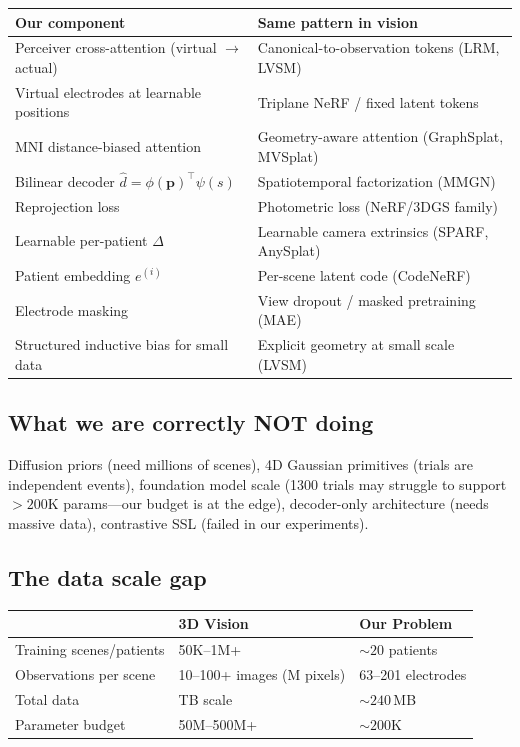 \documentclass[11pt,letterpaper]{article}
\newcommand{\bfp}{\mathbf{p}}
\begin{document}
\begin{table}[ht!]\centering\small
\begin{tabular}{@{}p{}p{}@{}}
\toprule
\textbf{Our component} & \textbf{Same pattern in vision} \\
\midrule
Perceiver cross-attention (virtual $\to$ actual) & Canonical-to-observation tokens (LRM, LVSM) \\
Virtual electrodes at learnable positions & Triplane NeRF / fixed latent tokens \\
MNI distance-biased attention & Geometry-aware attention (GraphSplat, MVSplat) \\
Bilinear decoder $\hat{d} = \phi(\bfp)^\top\psi(s)$ & Spatiotemporal factorization (MMGN) \\
Reprojection loss & Photometric loss (NeRF/3DGS family) \\
Learnable per-patient $\Delta$ & Learnable camera extrinsics (SPARF, AnySplat) \\
Patient embedding $e^{(i)}$ & Per-scene latent code (CodeNeRF) \\
Electrode masking & View dropout / masked pretraining (MAE) \\
Structured inductive bias for small data & Explicit geometry at small scale (LVSM) \\
\bottomrule
\end{tabular}
\end{table}

\subsection{What we are correctly NOT doing}

Diffusion priors (need millions of scenes), 4D Gaussian primitives (trials are independent events), foundation model scale (1300 trials may struggle to support ${>}200$K params---our budget is at the edge), decoder-only architecture (needs massive data), contrastive SSL (failed in our experiments).

\subsection{The data scale gap}

\begin{table}[ht!]\centering\small
\begin{tabular}{@{}lll@{}}
\toprule
& \textbf{3D Vision} & \textbf{Our Problem} \\
\midrule
Training scenes/patients & 50K--1M+ & ${\sim}20$ patients \\
Observations per scene & 10--100+ images (M pixels) & 63--201 electrodes \\
Total data & TB scale & ${\sim}240$\,MB \\
Parameter budget & 50M--500M+ & ${\sim}200$K \\
\bottomrule
\end{tabular}
\end{table}
\end{document}
